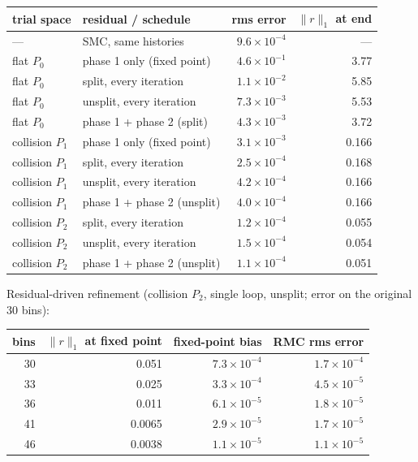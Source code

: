 \documentclass[11pt]{article}
\begin{document}
\begin{center}
\begin{tabular}{llr r}
\toprule
trial space & residual / schedule & rms error & $\|r\|_1$ at end \\
\midrule
--- & SMC, same histories & $9.6\times10^{-4}$ & --- \\
flat $P_0$ & phase 1 only (fixed point) & $4.6\times10^{-1}$ & 3.77 \\
flat $P_0$ & split, every iteration & $1.1\times10^{-2}$ & 5.85 \\
flat $P_0$ & unsplit, every iteration & $7.3\times10^{-3}$ & 5.53 \\
flat $P_0$ & phase 1 + phase 2 (split) & $4.3\times10^{-3}$ & 3.72 \\
collision $P_1$ & phase 1 only (fixed point) & $3.1\times10^{-3}$ & 0.166 \\
collision $P_1$ & split, every iteration & $2.5\times10^{-4}$ & 0.168 \\
collision $P_1$ & unsplit, every iteration & $4.2\times10^{-4}$ & 0.166 \\
collision $P_1$ & phase 1 + phase 2 (unsplit) & $4.0\times10^{-4}$ & 0.166 \\
collision $P_2$ & split, every iteration & $1.2\times10^{-4}$ & 0.055 \\
collision $P_2$ & unsplit, every iteration & $1.5\times10^{-4}$ & 0.054 \\
collision $P_2$ & phase 1 + phase 2 (unsplit) & $1.1\times10^{-4}$ & 0.051 \\
\bottomrule
\end{tabular}
\end{center}

\noindent Residual-driven refinement (collision $P_2$, single loop, unsplit; error on the
original 30 bins):

\begin{center}
\begin{tabular}{rrrr}
\toprule
bins & $\|r\|_1$ at fixed point & fixed-point bias & RMC rms error \\
\midrule
30 & 0.051 & $7.3\times10^{-4}$ & $1.7\times10^{-4}$ \\
33 & 0.025 & $3.3\times10^{-4}$ & $4.5\times10^{-5}$ \\
36 & 0.011 & $6.1\times10^{-5}$ & $1.8\times10^{-5}$ \\
41 & 0.0065 & $2.9\times10^{-5}$ & $1.7\times10^{-5}$ \\
46 & 0.0038 & $1.1\times10^{-5}$ & $1.1\times10^{-5}$ \\
\bottomrule
\end{tabular}
\end{center}
\end{document}
